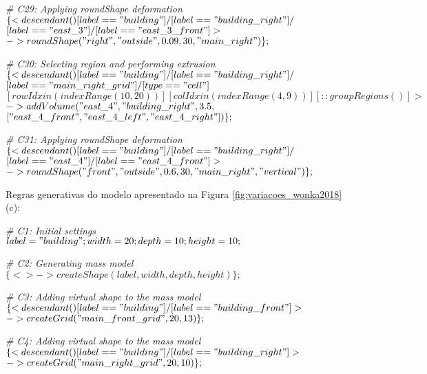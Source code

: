 \noindent \textit{\# C29: Applying roundShape deformation}\\
$\{< descendant() [label=="building"] / [label=="building\_right"] / $\\
$[label=="east\_3"] / [label=="east\_3\_front"] > $\\
$-> roundShape("right", "outside", 0.09, 30, "main\_right")\};$

\noindent \textit{\# C30: Selecting region and performing extrusion}\\
$\{< descendant() [label=="building"] / [label=="building\_right"] / $\\
$[label=="main\_right\_grid"] / [type=="cell"] $\\
$[rowIdx in (indexRange(10, 20))] [colIdx in (indexRange(4, 9))] [::groupRegions()] > $\\
$-> addVolume("east\_4", "building\_right", 3.5, $\\
$["east\_4\_front", "east\_4\_left", "east\_4\_right"])\};$

\noindent \textit{\# C31: Applying roundShape deformation}\\
$\{< descendant() [label=="building"] / [label=="building\_right"] / $\\
$[label=="east\_4"] / [label=="east\_4\_front"] > $\\
$-> roundShape("front", "outside", 0.6, 30, "main\_right", "vertical")\};$

\vspace{1cm}

Regras generativas do modelo apresentado na Figura \ref{fig:variacoes_wonka2018}(c):

\noindent \textit{\# C1: Initial settings}\\
$label = "building"; width = 20; depth = 10; height = 10;$

\noindent \textit{\# C2: Generating mass model}\\
$\{<> -> createShape(label, width, depth, height)\};$

\noindent \textit{\# C3: Adding virtual shape to the mass model}\\
$\{< descendant() [label=="building"] / [label=="building\_front"] > $\\
$-> createGrid("main\_front\_grid", 20, 13)\};$

\noindent \textit{\# C4: Adding virtual shape to the mass model}\\
$\{< descendant() [label=="building"] / [label=="building\_right"] > $\\
$-> createGrid("main\_right\_grid", 20, 10)\};$

